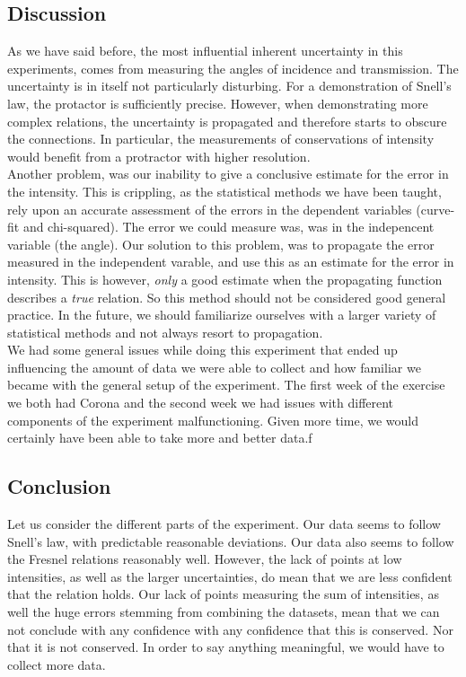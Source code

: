 \documentclass[working]{inputs/tuftebook}
\begin{document}
\subsection*{Discussion}
As we have said before, the most influential inherent uncertainty in this experiments, comes from measuring the angles of incidence and transmission. The uncertainty is in itself not particularly disturbing. For a demonstration of Snell's law, the protactor is sufficiently precise. However, when demonstrating more complex relations, the uncertainty is propagated and therefore starts to obscure the connections. In particular, the measurements of conservations of intensity would benefit from a protractor with higher resolution. \\
Another problem, was our inability to give a conclusive estimate for the error in the intensity. This is crippling, as the statistical methods we have been taught, rely upon an accurate assessment of the errors in the dependent variables (curve-fit and chi-squared). The error we could measure was, was in the indepencent variable (the angle). Our solution to this problem, was to propagate the error measured in the independent varable, and use this as an estimate for the error in intensity. This is however, \textit{only} a good estimate when the propagating function describes a \textit{true} relation. So this method should not be considered good general practice. In the future, we should familiarize ourselves with a larger variety of statistical methods and not always resort to propagation. \\
We had some general issues while doing this experiment that ended up influencing the amount of data we were able to collect and how familiar we became with the general setup of the experiment. The first week of the exercise we both had Corona and the second week we had issues with different components of the experiment malfunctioning. Given more time, we would certainly have been able to take more and better data.f
\subsection*{Conclusion}
Let us consider the different parts of the experiment. Our data seems to follow Snell's law, with predictable reasonable deviations. Our data also seems to follow the Fresnel relations reasonably well. However, the lack of points at low intensities, as well as the larger uncertainties, do mean that we are less confident that the relation holds. Our lack of points measuring the sum of intensities, as well the huge errors stemming from combining the datasets, mean that we can not conclude with any confidence with any confidence that this is conserved. Nor that it is not conserved. In order to say anything meaningful, we would have to collect more data.
\printbibliography
\end{document}
